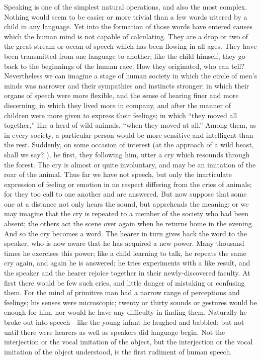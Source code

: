 \documentclass[11pt,letter]{article}
\begin{document}
\par  Speaking is one of the simplest natural operations, and also the most complex. Nothing would seem to be easier or more trivial than a few words uttered by a child in any language. Yet into the formation of those words have entered causes which the human mind is not capable of calculating. They are a drop or two of the great stream or ocean of speech which has been flowing in all ages. They have been transmitted from one language to another; like the child himself, they go back to the beginnings of the human race. How they originated, who can tell? Nevertheless we can imagine a stage of human society in which the circle of men’s minds was narrower and their sympathies and instincts stronger; in which their organs of speech were more flexible, and the sense of hearing finer and more discerning; in which they lived more in company, and after the manner of children were more given to express their feelings; in which “they moved all together,” like a herd of wild animals, “when they moved at all.” Among them, as in every society, a particular person would be more sensitive and intelligent than the rest. Suddenly, on some occasion of interest (at the approach of a wild beast, shall we say? ), he first, they following him, utter a cry which resounds through the forest. The cry is almost or quite involuntary, and may be an imitation of the roar of the animal. Thus far we have not speech, but only the inarticulate expression of feeling or emotion in no respect differing from the cries of animals; for they too call to one another and are answered. But now suppose that some one at a distance not only hears the sound, but apprehends the meaning: or we may imagine that the cry is repeated to a member of the society who had been absent; the others act the scene over again when he returns home in the evening. And so the cry becomes a word. The hearer in turn gives back the word to the speaker, who is now aware that he has acquired a new power. Many thousand times he exercises this power; like a child learning to talk, he repeats the same cry again, and again he is answered; he tries experiments with a like result, and the speaker and the hearer rejoice together in their newly-discovered faculty. At first there would be few such cries, and little danger of mistaking or confusing them. For the mind of primitive man had a narrow range of perceptions and feelings; his senses were microscopic; twenty or thirty sounds or gestures would be enough for him, nor would he have any difficulty in finding them. Naturally he broke out into speech—like the young infant he laughed and babbled; but not until there were hearers as well as speakers did language begin. Not the interjection or the vocal imitation of the object, but the interjection or the vocal imitation of the object understood, is the first rudiment of human speech.
\end{document}
